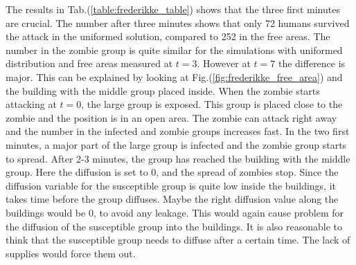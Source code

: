 \documentclass[%
twoside,                 %
final,                   %
chapterprefix=true,      %
open=right               %
10pt]{book}
\begin{document}
The results in Tab.(\ref{table:frederikke_table}) shows that the three first minutes are crucial. The number after three minutes shows that only 72 humans survived the attack in the uniformed solution, compared to 252 in the free areas. The number in the zombie group is quite similar for the simulations with uniformed distribution and free areas measured at $t=3$. However at $t=7$ the difference is major. This can be explained by looking at Fig.(\ref{fig:frederikke_free_area}) and the building with the middle group placed inside. When the zombie starts attacking at $t=0$, the large group is exposed. This group is placed close to the zombie and the position is in an open area. The zombie can attack right away and the number in the infected and zombie groups increases fast. In the two first minutes, a major part of the large group is infected and the zombie group starts to spread. After 2-3 minutes, the group has reached the building with the middle group. Here the diffusion is set to 0, and the spread of zombies stop. Since the diffusion variable for the susceptible group is quite low inside the buildings, it takes time before the group diffuses. Maybe the right diffusion value along the buildings would be 0, to avoid any leakage. This would again cause problem for the diffusion of the susceptible group into the buildings. It is also reasonable to think that the susceptible group needs to diffuse after a certain time. The lack of supplies would force them out.

\label{table:frederikke_table}
\end{document}
